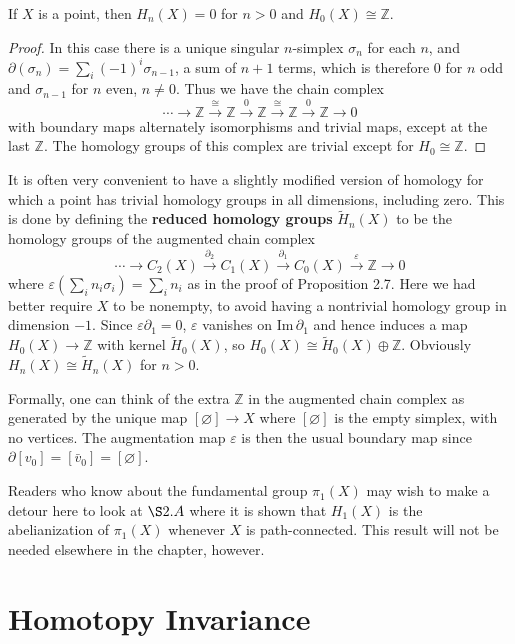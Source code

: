 \begin{proposition}
\label{prop:homology-point}
\uses{}
If $X$ is a point, then $H_n(X) = 0$ for $n > 0$ and $H_0(X) \cong \mathbb{Z}$.
\end{proposition}
\begin{proof}
 In this case there is a unique singular $n$-simplex $\sigma_n$ for each $n$, and $\partial(\sigma_n) =
\sum_i(-1)^i\sigma_{n-1}$, a sum of $n+1$ terms, which is therefore 0 for $n$ odd and $\sigma_{n-1}$ for $n$
even, $n \ne 0$. Thus we have the chain complex
$$\cdots \to \mathbb{Z} \xrightarrow{\cong} \mathbb{Z} \xrightarrow{0} \mathbb{Z} \xrightarrow{\cong} \mathbb{Z} \xrightarrow{0} \mathbb{Z} \to 0$$
with boundary maps alternately isomorphisms and trivial maps, except at the last $\mathbb{Z}$.
The homology groups of this complex are trivial except for $H_0 \cong \mathbb{Z}$.
\end{proof}
It is often very convenient to have a slightly modified version of homology for
which a point has trivial homology groups in all dimensions, including zero. This is
done by defining the \textbf{reduced homology groups} $\tilde H_n(X)$ to be the homology groups
of the augmented chain complex
$$\cdots \to C_2(X) \xrightarrow{\partial_2} C_1(X) \xrightarrow{\partial_1} C_0(X) \xrightarrow{\varepsilon} \mathbb{Z} \to 0$$
where $\varepsilon(\sum_i n_i\sigma_i) = \sum_i n_i$ as in the proof of Proposition 2.7. Here we had better
require $X$ to be nonempty, to avoid having a nontrivial homology group in dimension
$-1$. Since $\varepsilon\partial_1 = 0$, $\varepsilon$ vanishes on $\text{Im}\,\partial_1$ and hence induces a map $H_0(X) \to \mathbb{Z}$ with
kernel $\tilde H_0(X)$, so $H_0(X) \cong \tilde H_0(X) \oplus \mathbb{Z}$. Obviously $H_n(X) \cong \tilde H_n(X)$ for $n > 0$.

Formally, one can think of the extra $\mathbb{Z}$ in the augmented chain complex as generated by the unique map $[\varnothing]\to X$ where $[\varnothing]$ is the empty simplex, with no vertices.
The augmentation map $\varepsilon$ is then the usual boundary map since $\partial[v_0] = [\bar v_0] = [\varnothing]$.

Readers who know about the fundamental group $\pi_1(X)$ may wish to make a
detour here to look at $\S2.A$ where it is shown that $H_1(X)$ is the abelianization of
$\pi_1(X)$ whenever $X$ is path-connected. This result will not be needed elsewhere in the
chapter, however.

\section*{Homotopy Invariance}

